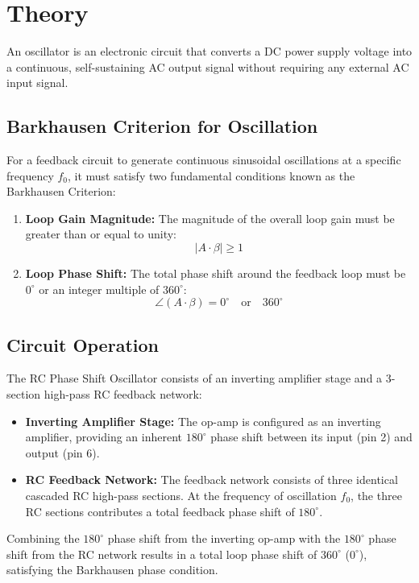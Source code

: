 \section{Theory}
An oscillator is an electronic circuit that converts a DC power supply voltage into a continuous, self-sustaining AC output signal without requiring any external AC input signal.

\subsection{Barkhausen Criterion for Oscillation}
For a feedback circuit to generate continuous sinusoidal oscillations at a specific frequency $f_0$, it must satisfy two fundamental conditions known as the Barkhausen Criterion:
\begin{enumerate}
	\item \textbf{Loop Gain Magnitude:} The magnitude of the overall loop gain must be greater than or equal to unity:
	\begin{equation}
		|A \cdot \beta| \ge 1
	\end{equation}
	\item \textbf{Loop Phase Shift:} The total phase shift around the feedback loop must be $0^\circ$ or an integer multiple of $360^\circ$:
	\begin{equation}
		\angle (A \cdot \beta) = 0^\circ \quad \text{or} \quad 360^\circ
	\end{equation}
\end{enumerate}

\subsection{Circuit Operation}
The RC Phase Shift Oscillator consists of an inverting amplifier stage and a 3-section high-pass RC feedback network:
\begin{itemize}
	\item \textbf{Inverting Amplifier Stage:} The op-amp is configured as an inverting amplifier, providing an inherent $180^\circ$ phase shift between its input (pin 2) and output (pin 6).
	\item \textbf{RC Feedback Network:} The feedback network consists of three identical cascaded RC high-pass sections. At the frequency of oscillation $f_0$, the three RC sections contributes a total feedback phase shift of $180^\circ$.
\end{itemize}

Combining the $180^\circ$ phase shift from the inverting op-amp with the $180^\circ$ phase shift from the RC network results in a total loop phase shift of $360^\circ$ ($0^\circ$), satisfying the Barkhausen phase condition.

